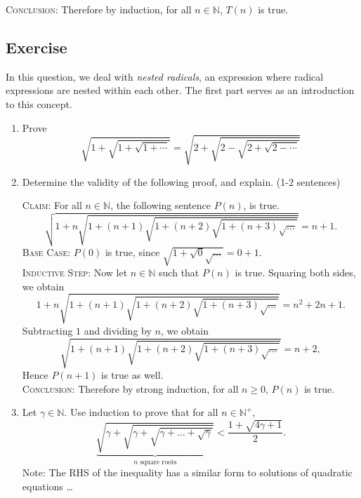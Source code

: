 \documentclass{article}
\newcounter{counter}
\newcommand{\Exercise}{Exercise \stepcounter{counter}\thecounter}
\begin{document}
    \vspace{1.5mm}
    \textsc{Conclusion}: Therefore by induction, for all $n \in \mathbb{N}$, $T(n)$ is true.

\subsection*{\Exercise}
    In this question, we deal with \textit{nested radicals}, an expression where radical expressions are nested within each other. The first part serves as an introduction to this concept.
    
    \begin{enumerate}
        \item Prove $$\sqrt{1 + \sqrt{1+ \sqrt{1 + \cdots}}} = \sqrt{2 + \sqrt{2 - \sqrt{2 + \sqrt{2 - \cdots}}}}$$
        \item Determine the validity of the following proof, and explain. (1-2 sentences)
        
        \vspace{1.5mm}
        \textsc{Claim}: For all $n \in \mathbb{N}$, the following sentence $P(n)$, is true.
        $$\sqrt{1+n\sqrt{1+(n+1)\sqrt{1+(n+2)\sqrt{1+(n+3)\sqrt{\ldots}}}}}=n+1.$$
        \textsc{Base Case}: $P(0)$ is true, since $\sqrt{1 + \sqrt{0}\sqrt{\dots}} = 0 + 1$. \\
        \textsc{Inductive Step}: Now let $n \in \mathbb{N}$ such that $P(n)$ is true. Squaring both sides, we obtain
        $$1+n\sqrt{1+(n+1)\sqrt{1+(n+2)\sqrt{1+(n+3)\sqrt{\ldots}}}}=n^2+2n+1.$$ Subtracting $1$ and dividing by $n$, we obtain $$\sqrt{1+(n+1)\sqrt{1+(n+2)\sqrt{1+(n+3)\sqrt{\ldots}}}}=n+2,$$
        Hence $P(n + 1)$ is true as well. \\
        \textsc{Conclusion}: Therefore by strong induction, for all $n \ge 0$, $P(n)$ is true.
        \item Let $\gamma \in \mathbb{N}$. Use induction to prove that for all $n \in \mathbb{N^{+}}$, $$\underbrace{\sqrt{\gamma + \sqrt{\gamma + \sqrt{\gamma + \dots + \sqrt{\gamma}}}}}_{\text{$n$ square roots}} < \frac{1 + \sqrt{4\gamma + 1}}{2}.$$
        Note: The RHS of the inequality has a similar form to solutions of quadratic equations \dots
    \end{enumerate}
\end{document}
